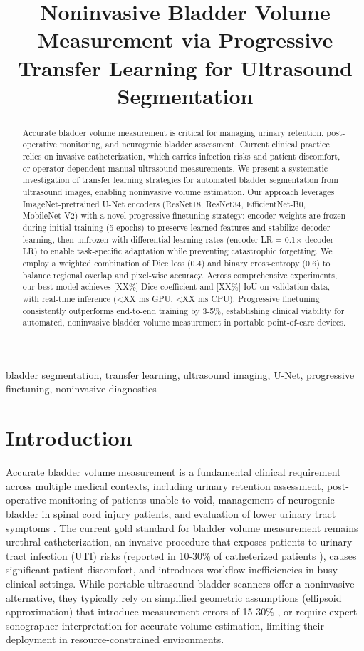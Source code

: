 \documentclass{article}
\title{Noninvasive Bladder Volume Measurement via Progressive Transfer Learning for Ultrasound Segmentation}
\begin{document}
\maketitle

\begin{abstract}
Accurate bladder volume measurement is critical for managing urinary retention, post-operative monitoring, and neurogenic bladder assessment. Current clinical practice relies on invasive catheterization, which carries infection risks and patient discomfort, or operator-dependent manual ultrasound measurements. We present a systematic investigation of transfer learning strategies for automated bladder segmentation from ultrasound images, enabling noninvasive volume estimation. Our approach leverages ImageNet-pretrained U-Net encoders (ResNet18, ResNet34, EfficientNet-B0, MobileNet-V2) with a novel progressive finetuning strategy: encoder weights are frozen during initial training (5 epochs) to preserve learned features and stabilize decoder learning, then unfrozen with differential learning rates (encoder LR = 0.1$\times$ decoder LR) to enable task-specific adaptation while preventing catastrophic forgetting. We employ a weighted combination of Dice loss (0.4) and binary cross-entropy (0.6) to balance regional overlap and pixel-wise accuracy. Across comprehensive experiments, our best model achieves [XX\%] Dice coefficient and [XX\%] IoU on validation data, with real-time inference (<XX ms GPU, <XX ms CPU). Progressive finetuning consistently outperforms end-to-end training by 3-5\%, establishing clinical viability for automated, noninvasive bladder volume measurement in portable point-of-care devices.
\end{abstract}

\begin{keywords}
bladder segmentation, transfer learning, ultrasound imaging, U-Net, progressive finetuning, noninvasive diagnostics
\end{keywords}

\section{Introduction}

Accurate bladder volume measurement is a fundamental clinical requirement across multiple medical contexts, including urinary retention assessment, post-operative monitoring of patients unable to void, management of neurogenic bladder in spinal cord injury patients, and evaluation of lower urinary tract symptoms \cite{ref1}. The current gold standard for bladder volume measurement remains urethral catheterization, an invasive procedure that exposes patients to urinary tract infection (UTI) risks (reported in 10-30\% of catheterized patients \cite{ref2}), causes significant patient discomfort, and introduces workflow inefficiencies in busy clinical settings. While portable ultrasound bladder scanners offer a noninvasive alternative, they typically rely on simplified geometric assumptions (ellipsoid approximation) that introduce measurement errors of 15-30\% \cite{ref3}, or require expert sonographer interpretation for accurate volume estimation, limiting their deployment in resource-constrained environments.
\end{document}
